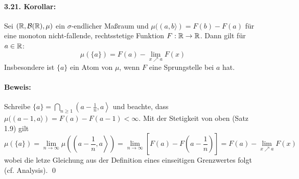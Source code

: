 \paragraph{3.21. Korollar:}Sei $(\mathbb{R},\mathcal{B}(\mathbb{R}),\mu)$ ein $\sigma$-endlicher Ma\ss{}raum und $\mu((a,b\rangle)=F(b)-F(a)$ f\"ur eine monoton nicht-fallende, rechtsstetige Funktion $F:\mathbb{R}\to\mathbb{R}$. Dann gilt f\"ur $a\in\mathbb{R}$:
$$\mu(\{a\})=F(a)-\lim_{x\nearrow a}F(x)$$
Insbesondere ist $\{a\}$ ein Atom von $\mu$, wenn $F$ eine Sprungstelle bei $a$ hat.

\paragraph{Beweis:}Schreibe $\{a\}=\bigcap_{n\geq1}\left(a-\frac{1}{n},a\right\rangle$ und beachte, dass $\mu((a-1,a\rangle)=F(a)-F(a-1)<\infty$. Mit der Stetigkeit von oben (Satz 1.9) gilt
$$\mu(\{a\})=\lim_{n\to\infty}\mu\left(\left(a-\frac{1}{n},a\right\rangle\right)=\lim_{n\to\infty}\left[F(a)-F\left(a-\frac{1}{n}\right)\right]=F(a)-\lim_{x\nearrow a}F(x)$$
wobei die letze Gleichung aus der Definition eines einseitigen Grenzwertes folgt (cf. Analysis). \qed